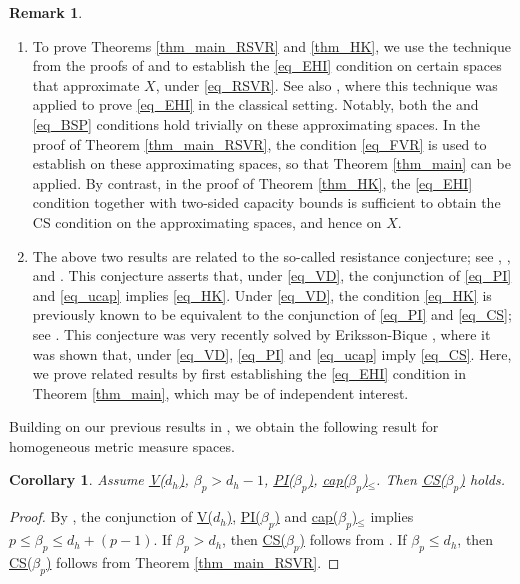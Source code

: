 \documentclass[11pt,a4paper]{article}
\numberwithin{equation}{section}
\theoremstyle{plain}
\newtheorem{corollary}[theorem]{Corollary}
\theoremstyle{definition}
\newtheorem{remark}[theorem]{Remark}
\begin{document}
\begin{remark}
\begin{enumerate}[label=(\arabic*)]
\item To prove Theorems \ref{thm_main_RSVR} and \ref{thm_HK}, we use the technique from the proofs of \cite[Theorem 1.1]{Mur23a} and \cite[Theorem 5.4]{MS25} to establish the \ref{eq_EHI} condition on certain spaces that approximate $X$, under \ref{eq_RSVR}. See also \cite[Theorem 4.3]{Hol03}, where this technique was applied to prove \ref{eq_EHI} in the classical setting. Notably, both the \hyperlink{eq_LSC}{} and \ref{eq_BSP} conditions hold trivially on these approximating spaces. In the proof of Theorem \ref{thm_main_RSVR}, the condition \ref{eq_FVR} is used to establish \hyperlink{eq_LLC}{} on these approximating spaces, so that Theorem \ref{thm_main} can be applied. By contrast, in the proof of Theorem \ref{thm_HK}, the \ref{eq_EHI} condition together with two-sided capacity bounds is sufficient to obtain the CS condition on the approximating spaces, and hence on $X$.
\item The above two results are related to the so-called resistance conjecture; see \cite[Remark 3.17(1)]{Bar13}, \cite[Conjecture 4.16]{GHL14}, and \cite[Conjecture on Page 155]{Gri22}. This conjecture asserts that, under \ref{eq_VD}, the conjunction of \ref{eq_PI} and \ref{eq_ucap} implies \ref{eq_HK}. Under \ref{eq_VD}, the condition \ref{eq_HK} is previously known to be equivalent to the conjunction of \ref{eq_PI} and \ref{eq_CS}; see \cite[Theorem 1.2]{GHL15}. This conjecture was very recently solved by Eriksson-Bique \cite{Eri26}, where it was shown that, under \ref{eq_VD}, \ref{eq_PI} and \ref{eq_ucap} imply \ref{eq_CS}. Here, we prove related results by first establishing the \ref{eq_EHI} condition in Theorem \ref{thm_main}, which may be of independent interest.
\end{enumerate}
\end{remark}

Building on our previous results in \cite{Yan25a,Yan25c}, we obtain the following result for homogeneous metric measure spaces.

\begin{corollary}\label{cor_main_homo}
Assume \hyperlink{eq_Vdh}{V($d_h$)}, $\beta_p>d_h-1$, \hyperlink{eq_PIbeta}{PI($\beta_p$)}, \hyperlink{eq_capbeta}{cap($\beta_p$)$_\le$}. Then \hyperlink{eq_CSbeta}{CS($\beta_p$)} holds.
\end{corollary}

\begin{proof}
By \cite[Proposition 2.1]{Yan25a}, the conjunction of \hyperlink{eq_Vdh}{V($d_h$)}, \hyperlink{eq_PIbeta}{PI($\beta_p$)} and \hyperlink{eq_capbeta}{cap($\beta_p$)$_\le$} implies $p\le\beta_p\le d_h+(p-1)$. If $\beta_p>d_h$, then \hyperlink{eq_CSbeta}{CS($\beta_p$)} follows from \cite[Theorem 2.3]{Yan25c}. If $\beta_p\le d_h$, then \hyperlink{eq_CSbeta}{CS($\beta_p$)} follows from Theorem \ref{thm_main_RSVR}.
\end{proof}
\end{document}
